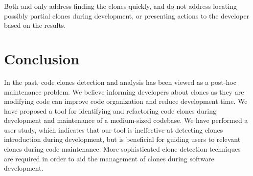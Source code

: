 \documentclass[nocopyrightspace,10pt]{sigplanconf}
\begin{document}
Both \cite{Keivanloo2011} and \cite{Lee2010} only address finding the
clones quickly, and do not address locating possibly partial clones
during development, or presenting actions to the developer based on
the results.

\section{Conclusion}
\label{sec:conclusion}

In the past, code clones detection and analysis has been viewed as a
post-hoc maintenance problem. 
We believe informing developers about clones as they are modifying code
 can improve code organization and reduce development time.
We have proposed a tool for identifying and refactoring code clones
during development and maintenance of a medium-sized codebase.
We have performed a user study, which indicates that our tool is
ineffective at detecting clones introduction during development, but is
beneficial for guiding users to relevant clones during code maintenance.
More sophisticated clone detection techniques are required in
order to aid the management of clones during software development.


%

%
%
\end{document}
